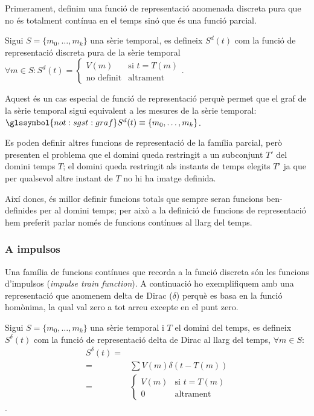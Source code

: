 Primerament, definim una funció de representació anomenada discreta
pura que no és totalment contínua en el temps sinó que és una funció
parcial.
\begin{definition}
  Sigui $S=\{m_0,\ldots,m_k\}$ una sèrie temporal, es defineix
  $S^d(t)$ com la funció de representació discreta pura de la sèrie
  temporal $\forall m \in S: S^d(t) =
  \begin{cases}
    V(m) & \text{si }  t=T(m) \\
    \text{no definit} & \text{altrament}
  \end{cases}$.
\end{definition}

Aquest és un cas especial de funció de representació perquè permet que
el graf de la sèrie temporal sigui equivalent a les mesures de la
sèrie temporal: $\glssymbol{not:sgst:graf} S^d(t) \equiv
\{m_0,\ldots,m_k\}$.

Es poden definir altres funcions de representació de la família
parcial, però presenten el problema que el domini queda restringit a
un subconjunt $T'$ del domini temps $T$; el domini queda restringit
als instants de temps elegits $T'$ ja que per qualsevol altre instant de
$T$ no hi ha imatge definida.

Així doncs, és millor definir funcions totals que sempre seran
funcions ben-definides per al domini temps; per això a la definició de
funcions de representació hem preferit parlar només de funcions
contínues al llarg del temps. 




\subsubsection{A impulsos}

Una família de funcions contínues que recorda a la funció discreta són
les funcions d'impulsos (\emph{impulse train function}).  A
continuació ho exemplifiquem amb una representació que anomenem delta
de Dirac ($\delta$) perquè es basa en la funció homònima, la qual val
zero a tot arreu excepte en el punt zero.

\begin{definition}
  Sigui $S=\{m_0,\ldots,m_k\}$ una sèrie temporal i $T$ el domini del
  temps, es defineix $S^\delta(t)$ com la funció de representació
  delta de Dirac al llarg del temps, $\forall m \in S:$
  \begin{align*}
    S^\delta(t) = &  \\
    = & \sum V(m) \delta(t-T(m))  \\
    = & \begin{cases}
      V(m) & \text{si }  t=T(m) \\
      0 & \text{altrament}
    \end{cases}
         \end{align*}.
\end{definition}





